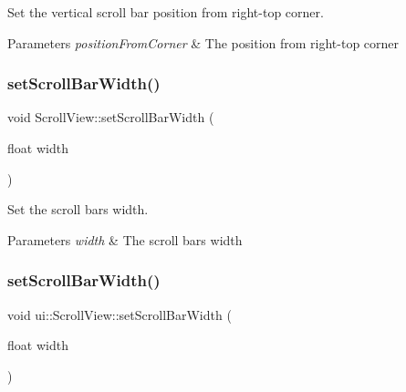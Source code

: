 Set the vertical scroll bar position from right-\/top corner. 


\begin{DoxyParams}{Parameters}
{\em position\+From\+Corner} & The position from right-\/top corner \\
\hline
\end{DoxyParams}
\mbox{\label{classui_1_1ScrollView_a054ab40fea1eca71a27b4e68286907dc}} 
\subsubsection{\texorpdfstring{set\+Scroll\+Bar\+Width()}{setScrollBarWidth()}\hspace{0.1cm}{\footnotesize\ttfamily [1/2]}}
{\footnotesize\ttfamily void Scroll\+View\+::set\+Scroll\+Bar\+Width (\begin{DoxyParamCaption}\item[{float}]{width }\end{DoxyParamCaption})}



Set the scroll bar\textquotesingle{}s width. 


\begin{DoxyParams}{Parameters}
{\em width} & The scroll bar\textquotesingle{}s width \\
\hline
\end{DoxyParams}
\mbox{\label{classui_1_1ScrollView_a0dbec02f20b0b8ef401c6ddd14e4e1de}} 
\subsubsection{\texorpdfstring{set\+Scroll\+Bar\+Width()}{setScrollBarWidth()}\hspace{0.1cm}{\footnotesize\ttfamily [2/2]}}
{\footnotesize\ttfamily void ui\+::\+Scroll\+View\+::set\+Scroll\+Bar\+Width (\begin{DoxyParamCaption}\item[{float}]{width }\end{DoxyParamCaption})}



